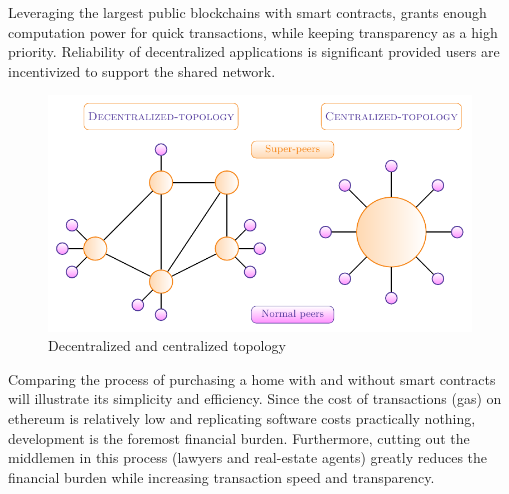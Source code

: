 \documentclass[12pt]{scrreprt}
\begin{document}
Leveraging the largest public blockchains with smart contracts, grants enough computation power 
for quick transactions, while keeping transparency as a high priority. Reliability of decentralized applications is significant provided users are incentivized to support the shared network.

 	\begin{figure}[ht]
  	\centering 
  	\includegraphics[width=1\linewidth]{ms-II/DappVApp.pdf}
  	\caption{Decentralized and centralized topology}
  	\label{toplogy}
  	\end{figure}
  	
  	 Comparing the process of purchasing a home with and without smart contracts will illustrate its simplicity and efficiency. Since the cost of transactions (gas) on ethereum is relatively low \cite{ethereumWhitePaper:Online} and replicating software costs practically nothing, development is the foremost financial burden.   Furthermore, cutting out the middlemen in this process (lawyers and real-estate agents) greatly reduces the financial burden while increasing transaction speed and transparency.
  	
\end{document}
